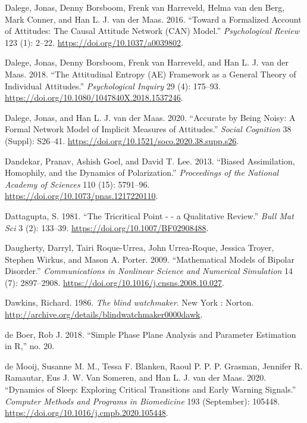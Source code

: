 \documentclass[
  a4paper,
  DIV=11,
  numbers=noendperiod,
  oneside]{scrreprt}
\newlength{\cslhangindent}
\newenvironment{CSLReferences}[2] %
 {\begin{list}{}{%
  \setlength{\itemindent}{0pt}
  \setlength{\leftmargin}{0pt}
  \setlength{\parsep}{0pt}
  \ifodd #1
   \setlength{\leftmargin}{\cslhangindent}
   \setlength{\itemindent}{-1\cslhangindent}
  \fi
  \setlength{\itemsep}{#2\baselineskip}}}
 {\end{list}}
\begin{document}
\begin{CSLReferences}{1}{0}
Dalege, Jonas, Denny Borsboom, Frenk van Harreveld, Helma van den Berg,
Mark Conner, and Han L. J. van der Maas. 2016. {``Toward a Formalized
Account of Attitudes: {The Causal Attitude Network} ({CAN}) Model.''}
\emph{Psychological Review} 123 (1): 2--22.
\url{https://doi.org/10.1037/a0039802}.

Dalege, Jonas, Denny Borsboom, Frenk van Harreveld, and Han L. J. van
der Maas. 2018. {``The {Attitudinal Entropy} ({AE}) Framework as a
General Theory of Individual Attitudes.''} \emph{Psychological Inquiry}
29 (4): 175--93. \url{https://doi.org/10.1080/1047840X.2018.1537246}.

Dalege, Jonas, and Han L. J. van der Maas. 2020. {``Accurate by Being
Noisy: {A} Formal Network Model of Implicit Measures of Attitudes.''}
\emph{Social Cognition} 38 (Suppl): S26--41.
\url{https://doi.org/10.1521/soco.2020.38.supp.s26}.

Dandekar, Pranav, Ashish Goel, and David T. Lee. 2013. {``Biased
Assimilation, Homophily, and the Dynamics of Polarization.''}
\emph{Proceedings of the National Academy of Sciences} 110 (15):
5791--96. \url{https://doi.org/10.1073/pnas.1217220110}.

Dattagupta, S. 1981. {``The Tricritical Point - - a Qualitative
Review.''} \emph{Bull Mat Sci} 3 (2): 133--39.
\url{https://doi.org/10.1007/BF02908488}.

Daugherty, Darryl, Tairi Roque-Urrea, John Urrea-Roque, Jessica Troyer,
Stephen Wirkus, and Mason A. Porter. 2009. {``Mathematical Models of
Bipolar Disorder.''} \emph{Communications in Nonlinear Science and
Numerical Simulation} 14 (7): 2897--2908.
\url{https://doi.org/10.1016/j.cnsns.2008.10.027}.

Dawkins, Richard. 1986. \emph{The blind watchmaker}. New York : Norton.
\url{http://archive.org/details/blindwatchmaker0000dawk}.

de Boer, Rob J. 2018. {``Simple Phase Plane Analysis and Parameter
Estimation in {R},''} no. 20.

de Mooij, Susanne M. M., Tessa F. Blanken, Raoul P. P. P. Grasman,
Jennifer R. Ramautar, Eus J. W. Van Someren, and Han L. J. van der Maas.
2020. {``Dynamics of Sleep: {Exploring} Critical Transitions and Early
Warning Signals.''} \emph{Computer Methods and Programs in Biomedicine}
193 (September): 105448.
\url{https://doi.org/10.1016/j.cmpb.2020.105448}.


\end{CSLReferences}
\end{document}
